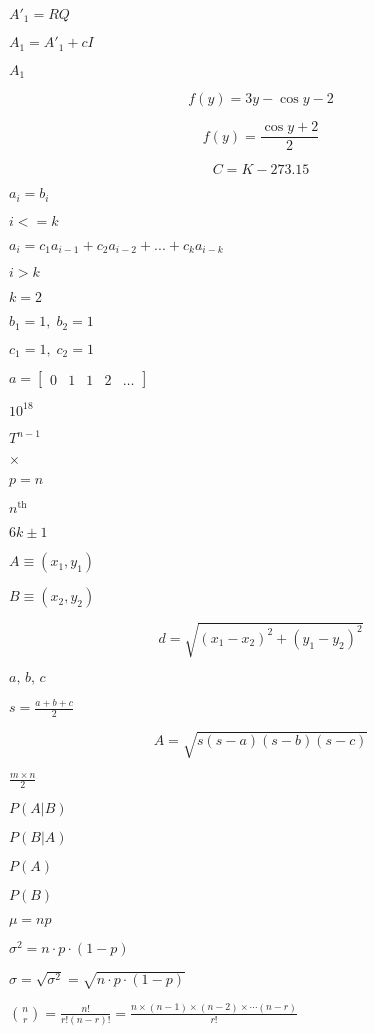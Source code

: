 \documentclass{article}
\begin{document}
$A'_1 = RQ $
\pagebreak

$A_1 = A'_1 + cI$
\pagebreak

$A_1$
\pagebreak

\[f(y) = 3y - \cos y -2\]
\pagebreak

\[f(y) = \frac{\cos y+2}{2}\]
\pagebreak

\[ C = K - 273.15 \]
\pagebreak

$a_i = b_i$
\pagebreak

$i <= k$
\pagebreak

$a_i = c_1 a_{i-1} + c_2 a_{i-2} + ... + c_k a_{i-k}$
\pagebreak

$i > k$
\pagebreak

$k=2$
\pagebreak

$b_1 = 1,\; b_2=1$
\pagebreak

$c_1 = 1,\; c_2=1$
\pagebreak

$a = \begin{bmatrix}0& 1& 1& 2& \ldots\end{bmatrix}$
\pagebreak

$10^{18}$
\pagebreak

$T^{n-1}$
\pagebreak

$\times$
\pagebreak

$p=n$
\pagebreak

$n^\text{th}$
\pagebreak

$6k\pm1$
\pagebreak

$A\equiv(x_1,y_1)$
\pagebreak

$B\equiv(x_2,y_2)$
\pagebreak

\[d=\sqrt{\left(x_1-x_2\right)^2+\left(y_1-y_2\right)^2}\]
\pagebreak

$a,\,b,\,c$
\pagebreak

$s=\displaystyle\frac{a+b+c}{2}$
\pagebreak

\[A=\sqrt{s(s-a)(s-b)(s-c)}\]
\pagebreak

$\frac{m\times n}{2}$
\pagebreak

$P(A|B)$
\pagebreak

$P(B|A)$
\pagebreak

$P(A)$
\pagebreak

$P(B)$
\pagebreak

$\mu=np$
\pagebreak

$\sigma^2 = n\cdot p\cdot (1-p)$
\pagebreak

$\sigma = \sqrt{\sigma^2} = \sqrt{n\cdot p\cdot (1-p)}$
\pagebreak

$\displaystyle {n\choose r} =
\frac{n!}{r!(n-r)!} = \frac{n\times(n-1)\times(n-2)\times\cdots(n-r)}{r!}
$
\pagebreak
\end{document}
